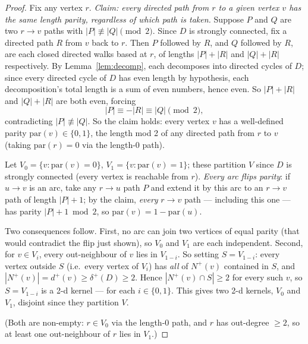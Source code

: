 \documentclass[11pt]{article}
\theoremstyle{plain}
\begin{document}
\begin{proof}
Fix any vertex $r$. \emph{Claim: every directed path from $r$ to a given vertex $v$
has the same length parity, regardless of which path is taken.} Suppose $P$ and $Q$
are two $r \to v$ paths with $|P| \not\equiv |Q| \pmod 2$. Since $D$ is strongly
connected, fix a directed path $R$ from $v$ back to $r$. Then $P$ followed by $R$,
and $Q$ followed by $R$, are each closed directed walks based at $r$, of lengths
$|P|+|R|$ and $|Q|+|R|$ respectively. By Lemma~\ref{lem:decomp}, each decomposes into
directed cycles of $D$; since every directed cycle of $D$ has even length by
hypothesis, each decomposition's total length is a sum of even numbers, hence even.
So $|P|+|R|$ and $|Q|+|R|$ are both even, forcing
\[
|P| \equiv -|R| \equiv |Q| \pmod 2,
\]
contradicting $|P| \not\equiv |Q|$. So the claim holds: every vertex $v$ has a
well-defined parity $\mathrm{par}(v) \in \{0,1\}$, the length mod 2 of any directed
path from $r$ to $v$ (taking $\mathrm{par}(r) = 0$ via the length-0 path).

Let $V_0 = \{v : \mathrm{par}(v) = 0\}$, $V_1 = \{v : \mathrm{par}(v) = 1\}$; these
partition $V$ since $D$ is strongly connected (every vertex is reachable from $r$).
\emph{Every arc flips parity}: if $u \to v$ is an arc, take any $r \to u$ path $P$ and
extend it by this arc to an $r \to v$ path of length $|P|+1$; by the claim, \emph{every}
$r \to v$ path — including this one — has parity $|P|+1 \bmod 2$, so
$\mathrm{par}(v) = 1 - \mathrm{par}(u)$.

Two consequences follow. First, no arc can join two vertices of equal parity (that
would contradict the flip just shown), so $V_0$ and $V_1$ are each independent.
Second, for $v \in V_i$, every out-neighbour of $v$ lies in $V_{1-i}$. So setting
$S = V_{1-i}$: every vertex outside $S$ (i.e.\ every vertex of $V_i$) has \emph{all}
of $N^+(v)$ contained in $S$, and $|N^+(v)| = d^+(v) \ge \delta^+(D) \ge 2$. Hence
$|N^+(v) \cap S| \ge 2$ for every such $v$, so $S = V_{1-i}$ is a 2-d kernel — for each
$i \in \{0,1\}$. This gives two 2-d kernels, $V_0$ and $V_1$, disjoint since they
partition $V$.

(Both are non-empty: $r \in V_0$ via the length-0 path, and $r$ has out-degree
$\ge 2$, so at least one out-neighbour of $r$ lies in $V_1$.)
\end{proof}
\end{document}
